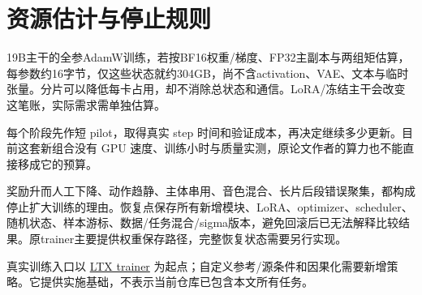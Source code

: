 \section{资源估计与停止规则}\label{seedance-m20-ux8d44ux6e90ux4f30ux8ba1ux4e0eux505cux6b62ux89c4ux5219}

19B主干的全参AdamW训练，若按BF16权重/梯度、FP32主副本与两组矩估算，每参数约16字节，仅这些状态就约304GB，尚不含activation、VAE、文本与临时张量。分片可以降低每卡占用，却不消除总状态和通信。LoRA/冻结主干会改变这笔账，实际需求需单独估算。

每个阶段先作短 pilot，取得真实 step 时间和验证成本，再决定继续多少更新。目前这套新组合没有 GPU 速度、训练小时与质量实测，原论文作者的算力也不能直接移成它的预算。

奖励升而人工下降、动作趋静、主体串用、音色混合、长片后段错误聚集，都构成停止扩大训练的理由。恢复点保存所有新增模块、LoRA、optimizer、scheduler、随机状态、样本游标、数据/任务混合/sigma版本，避免回滚后已无法解释比较结果。原trainer主要提供权重保存路径，完整恢复状态需要另行实现。

真实训练入口以 \href{https://github.com/Lightricks/LTX-2/tree/bd92a5f408eb8c99f8c05e9fe2fcaaec8b56b638/packages/ltx-trainer}{LTX trainer} 为起点；自定义参考/源条件和因果化需要新增策略。它提供实施基础，不表示当前仓库已包含本文所有任务。
